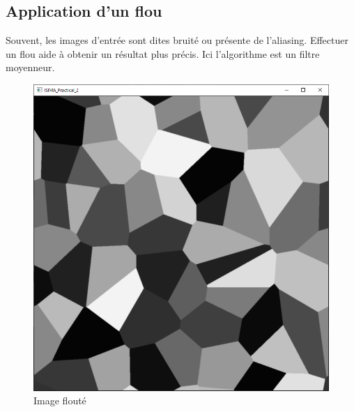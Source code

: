 \documentclass{article}
\begin{document}
\subsection{Application d'un flou}
Souvent, les images d'entrée sont dites bruité ou présente de l'aliasing. Effectuer un flou aide à obtenir un résultat plus précis. Ici l'algorithme est un filtre moyenneur.
\begin{figure}[H]
	\centering
	\includegraphics[scale=0.3]{images/blur.png}
	\caption{Image flouté}
\end{figure}
\end{document}
